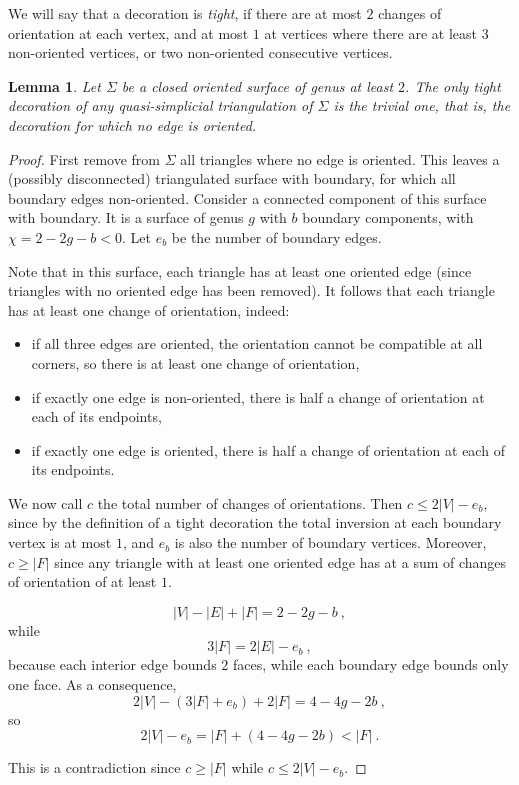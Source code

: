 \documentclass[notitlepage,twoside,a4paper]{amsart}
\newtheorem{lemma}[theorem]{\rm\bf Lemma}
\theoremstyle{named}
\begin{document}
We will say that a decoration is {\em tight}, if there are at most $2$ changes of orientation at each vertex, and at most $1$ at vertices where there are at least $3$ non-oriented vertices, or two non-oriented consecutive vertices. 

\begin{lemma}\label{lm:pak}
  Let $\Sigma$ be a closed oriented surface of genus at least $2$. The only tight decoration of any quasi-simplicial triangulation of $\Sigma$ is the trivial one, that is, the decoration for which no edge is oriented.
\end{lemma}

\begin{proof}
  First remove from $\Sigma$ all triangles where no edge is oriented. This leaves a (possibly disconnected) triangulated surface with boundary, for which all boundary edges non-oriented.  Consider a connected component of this surface with boundary. It is a surface of genus $g$ with $b$ boundary components, with $\chi=2-2g-b<0$. Let $e_b$ be the number of boundary edges. 

  Note that in this surface, each triangle has at least one oriented edge (since triangles with no oriented edge has been removed). It follows that each triangle has at least one change of orientation, indeed:
  \begin{itemize}
  \item if all three edges are oriented, the orientation cannot be compatible at all corners, so there is at least one change of orientation,
  \item if exactly one edge is non-oriented, there is half a change of orientation at each of its endpoints,
  \item if exactly one edge is oriented, there is half a change of orientation at each of its endpoints.
  \end{itemize}

  We now call $c$ the total number of changes of orientations. Then $c\leq 2|V|-e_b$, since by the definition of a tight decoration the total inversion at each boundary vertex is at most $1$, and $e_b$ is also the number of boundary vertices. Moreover, $c\geq |F|$ since any triangle with at least one oriented edge has at a sum of changes of orientation of at least $1$. 

  $$ |V|-|E|+|F| = 2-2g-b~, $$
  while
  $$ 3|F| = 2|E|-e_b~, $$
  because each interior edge bounds $2$ faces, while each boundary edge bounds only one face. As a consequence,
  $$ 2|V|-(3|F|+e_b)+2|F| = 4-4g-2b~, $$
  so
  $$ 2|V|-e_b = |F| + (4-4g-2b) < |F|~. $$

  This is a contradiction since $c\geq |F|$ while $c\leq 2|V|-e_b$.  
\end{proof}
\end{document}

